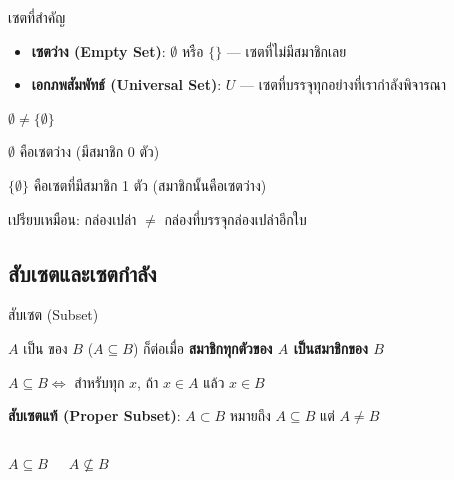 \documentclass[11pt, aspectratio=169]{beamer}
\begin{document}
\begin{frame}{เซตที่สำคัญ}
  \begin{explanation}
    \begin{itemize}
      \item \textbf{เซตว่าง (Empty Set)}: $\emptyset$ หรือ $\{\}$ — เซตที่ไม่มีสมาชิกเลย
      \item \textbf{เอกภพสัมพัทธ์ (Universal Set)}: $U$ — เซตที่บรรจุทุกอย่างที่เรากำลังพิจารณา
    \end{itemize}
  \end{explanation}

  \begin{exambox}[ข้อควรระวัง]
    $\emptyset \neq \{\emptyset\}$

    \medskip
    $\emptyset$ คือเซตว่าง (มีสมาชิก 0 ตัว)

    $\{\emptyset\}$ คือเซตที่มีสมาชิก 1 ตัว (สมาชิกนั้นคือเซตว่าง)

    \medskip
    เปรียบเหมือน: กล่องเปล่า $\neq$ กล่องที่บรรจุกล่องเปล่าอีกใบ
  \end{exambox}
\end{frame}

\subsection{สับเซตและเซตกำลัง}

\begin{frame}{สับเซต (Subset)}
  \begin{explanation}[นิยาม]
    $A$ เป็น  ของ $B$ ($A \subseteq B$) ก็ต่อเมื่อ
    \textbf{สมาชิกทุกตัวของ $A$ เป็นสมาชิกของ $B$}

    \medskip
    $A \subseteq B \iff$ สำหรับทุก $x$, ถ้า $x \in A$ แล้ว $x \in B$

    \medskip
    \textbf{สับเซตแท้ (Proper Subset)}: $A \subset B$ หมายถึง $A \subseteq B$ แต่ $A \neq B$
  \end{explanation}

  \begin{columns}[T]
      \centering
      \textbf{$A \subseteq B$}


      \centering
      \textbf{$A \not\subseteq B$}

  \end{columns}
\end{frame}
\end{document}
